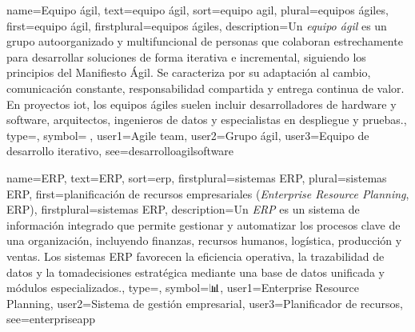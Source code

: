 	
	
	{
		name={Equipo {\'a}gil},
		text={equipo {\'a}gil},
		sort={equipo agil},
		plural={equipos {\'a}giles},
		first={equipo {\'a}gil},
		firstplural={equipos {\'a}giles},
		description={Un \emph{equipo {\'a}gil} es un grupo autoorganizado y multifuncional de personas que colaboran estrechamente para desarrollar soluciones de forma iterativa e incremental, siguiendo los principios del Manifiesto {\'A}gil. Se caracteriza por su adaptaci{\'o}n al cambio, comunicaci{\'o}n constante, responsabilidad compartida y entrega continua de valor. En proyectos \gls{iot}, los equipos {\'a}giles suelen incluir desarrolladores de hardware y software, arquitectos, ingenieros de datos y especialistas en despliegue y pruebas.},
		type=\glsdefaulttype,
		symbol={🤝},
		user1={Agile team},
		user2={Grupo {\'a}gil},
		user3={Equipo de desarrollo iterativo},
		see={desarrolloagilsoftware}
	}
	
	{
		name={ERP},
		text={ERP},
		sort={erp},
		firstplural={sistemas ERP},
		plural={sistemas ERP},
		first={planificaci{\'o}n de recursos empresariales (\textit{Enterprise Resource Planning}, ERP)},
		firstplural={sistemas ERP},
		description={Un \emph{ERP} es un sistema de informaci{\'o}n integrado que permite gestionar y automatizar los procesos clave de una organizaci{\'o}n, incluyendo finanzas, recursos humanos, log{\'i}stica, producci{\'o}n y ventas. Los sistemas ERP favorecen la eficiencia operativa, la trazabilidad de \glspl{dato} y la \gls{tomadecisiones} estrat{\'e}gica mediante una base de datos unificada y m{\'o}dulos especializados.},
		type=\glsdefaulttype,
		symbol={📊},
		user1={Enterprise Resource Planning},
		user2={Sistema de gesti{\'o}n empresarial},
		user3={Planificador de recursos},
		see={enterpriseapp}
	}
	
